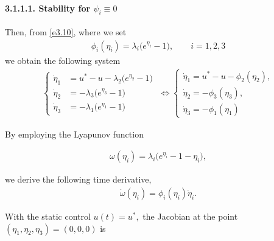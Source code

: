 \documentclass[10pt, a4paper]{amsart}
\theoremstyle{plain}
\theoremstyle{definition}
\theoremstyle{remark}
\numberwithin{equation}{section}
\begin{document}
\paragraph{\bf 3.1.1.1. Stability for $\psi_i\equiv 0$}
Then, from \eqref{e3.10}, where we set  
\begin{align}
\phi_i(\eta_i)=\lambda_i\bigl(e^{\eta_i}-1\bigr),\qquad i=1,2,3
\end{align}
we obtain the following system
 \begin{align}\label{ee3.27}
   \begin{cases}
       \dot\eta_1 
   &= u^* - u - \lambda_2\bigl(e^{\eta_2}-1\bigr) \\
   \dot\eta_2 
   &= -\lambda_3\bigl(e^{\eta_3}-1\bigr)\\
   \dot\eta_3 
   &= -\lambda_1\bigl(e^{\eta_1}-1\bigr)
   \end{cases}\;\Longleftrightarrow\begin{cases}
       \dot\eta_1 = u^* - u - \phi_2(\eta_2),\\
\dot\eta_2 =  - \phi_3(\eta_3),\\
\dot\eta_3 =  - \phi_1(\eta_1)
   \end{cases}
 \end{align}

By employing the Lyapunov function

\begin{align}\label{a3.27}
    \omega(\eta_i)
 = \lambda_i\bigl(e^{\eta_i} - 1 - \eta_i\bigr),%
\end{align}

 we derive the following time derivative, 
\begin{align}\label{a3.28}
    \dot \omega(\eta_i)
 = \phi_i(\eta_i)\dot \eta_i.%
\end{align}

 


With the static control $ u(t) = u^*,$ the Jacobian at the point $(\eta_1, \eta_2, \eta_3) = (0, 0, 0)$ is
\end{document}
